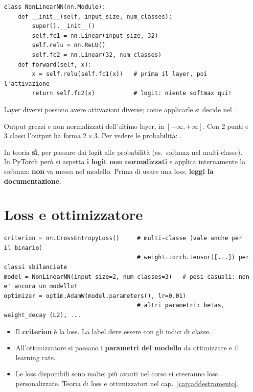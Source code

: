 \begin{lstlisting}
class NonLinearNN(nn.Module):
    def __init__(self, input_size, num_classes):
        super().__init__()
        self.fc1 = nn.Linear(input_size, 32)
        self.relu = nn.ReLU()
        self.fc2 = nn.Linear(32, num_classes)
    def forward(self, x):
        x = self.relu(self.fc1(x))   # prima il layer, poi l'attivazione
        return self.fc2(x)           # logit: niente softmax qui!
\end{lstlisting}
Layer diversi possono avere attivazioni diverse; come applicarle si decide nel .

\begin{definizione}[logit]
Output grezzi e non normalizzati dell'ultimo layer, in $[-\infty, +\infty]$. Con 2 punti e 3 classi l'output ha forma
$2 \times 3$. Per vedere le probabilità: .
\end{definizione}

\begin{esame}
In teoria \textbf{sì}, per passare dai logit alle probabilità (es.\ softmax nel multi-classe). In PyTorch però
 si aspetta \textbf{i logit non normalizzati} e applica internamente la softmax: \textbf{non}
va messa nel modello. Prima di usare una loss, \textbf{leggi la documentazione}.
\end{esame}

\section{Loss e ottimizzatore}
\begin{lstlisting}
criterion = nn.CrossEntropyLoss()     # multi-classe (vale anche per il binario)
                                      # weight=torch.tensor([...]) per classi sbilanciate
model = NonLinearNN(input_size=2, num_classes=3)   # pesi casuali: non e' ancora un modello!
optimizer = optim.AdamW(model.parameters(), lr=0.01)
                                      # altri parametri: betas, weight_decay (L2), ...
\end{lstlisting}
\begin{itemize}
  \item Il \textbf{criterion} è la loss. La label deve essere  con gli indici di classe.
  \item All'ottimizzatore si passano i \textbf{parametri del modello} da ottimizzare e il learning rate.
  \item Le loss disponibili sono molte; più avanti nel corso si creeranno loss personalizzate. Teoria di loss e ottimizzatori
        nel cap.~\ref{cap:addestramento}.
\end{itemize}

